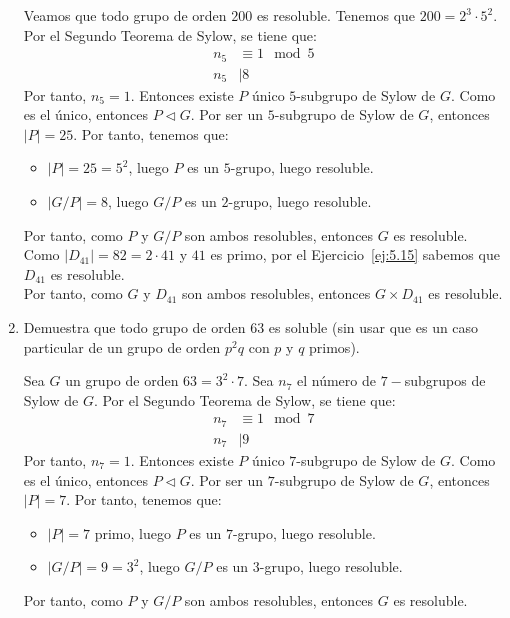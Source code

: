 \begin{ejercicio}
\begin{enumerate}
        Veamos que todo grupo de orden $200$ es resoluble. Tenemos que $200=2^3\cdot 5^2$. Por el Segundo Teorema de Sylow, se tiene que:
        \begin{align*}
            n_5 &\equiv 1 \mod 5 \\
            n_5 &\mid 8
        \end{align*}
        Por tanto, $n_5=1$. Entonces existe $P$ único $5$-subgrupo de Sylow de $G$. Como es el único, entonces $P\lhd G$. Por ser un $5$-subgrupo de Sylow de $G$, entonces $|P|=25$. Por tanto, tenemos que:
        \begin{itemize}
            \item $|P|=25=5^2$, luego $P$ es un $5$-grupo, luego resoluble.
            \item $|G/P|=8$, luego $G/P$ es un $2$-grupo, luego resoluble.
        \end{itemize}
        Por tanto, como $P$ y $G/P$ son ambos resolubles, entonces $G$ es resoluble.\\

        Como $|D_{41}|=82=2\cdot 41$ y $41$ es primo, por el Ejercicio~\ref{ej:5.15} sabemos que $D_{41}$ es resoluble.\\

        Por tanto, como $G$ y $D_{41}$ son ambos resolubles, entonces $G\times D_{41}$ es resoluble.
        \item Demuestra que todo grupo de orden $63$ es soluble (sin usar que es un caso particular de un grupo de orden $p^2q$ con $p$ y $q$ primos).
        
        Sea $G$ un grupo de orden $63=3^2\cdot 7$. Sea $n_7$ el número de $7-$subgrupos de Sylow de $G$. Por el Segundo Teorema de Sylow, se tiene que:
        \begin{align*}
            n_7 &\equiv 1 \mod 7 \\
            n_7 &\mid 9
        \end{align*}
        Por tanto, $n_7=1$. Entonces existe $P$ único $7$-subgrupo de Sylow de $G$. Como es el único, entonces $P\lhd G$. Por ser un $7$-subgrupo de Sylow de $G$, entonces $|P|=7$. Por tanto, tenemos que:
        \begin{itemize}
            \item $|P|=7$ primo, luego $P$ es un $7$-grupo, luego resoluble.
            \item $|G/P|=9=3^2$, luego $G/P$ es un $3$-grupo, luego resoluble.
        \end{itemize}
        Por tanto, como $P$ y $G/P$ son ambos resolubles, entonces $G$ es resoluble.
    \end{enumerate}
\end{ejercicio}

